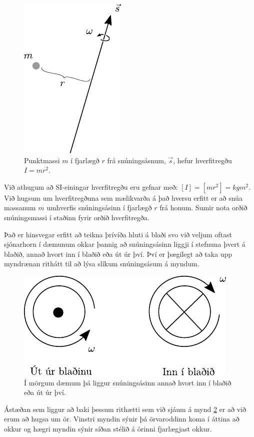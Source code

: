 \begin{figure}[H]
    \centering
    \includegraphics[scale=1.2]{figures/hverfi.pdf}
    \caption{Punktmassi $m$ í fjarlægð $r$ frá snúningsásnum, $\vec{s}$, hefur hverfitregðu $I = mr^2$.}
    \label{fig:hverfi}
\end{figure}
Við athugum að SI-einingar hverfitregðu eru gefnar með: $[I] = [mr^2] = \si{kgm^2}$. Við hugsum um hverfitregðuna sem mælikvarða á það hversu erfitt er að snúa massanum $m$ umhverfis snúningsásinn í fjarlægð $r$ frá honum. Sumir nota orðið snúningsmassi í staðinn fyrir orðið hverfitregða.

Það er hinsvegar erfitt að teikna þrívíða hluti á blaði svo við veljum oftast sjónarhorn í dæmunum okkar þannig að snúningsásinn liggji í stefnuna þvert á blaðið, annað hvort inn í blaðið eða út úr því. Því er þægilegt að taka upp myndrænan rithátt til að lýsa slíkum snúningsásum á myndum.

\begin{figure}[H]
    \centering
    \includegraphics{figures/haegri.pdf}
    \caption{Í mörgum dæmum þá liggur snúningsásinn annað hvort inn í blaðið eða út úr því.}
    \label{fig:orvar}
\end{figure}

Ástæðan sem liggur að baki þessum rithætti sem við sjáum á mynd \ref{fig:orvar} er að við erum að hugsa um ör. Vinstri myndin sýnir þá örvaroddinn koma í áttina að okkur og hægri myndin sýnir síðan stélið á örinni fjarlægjast okkur.

